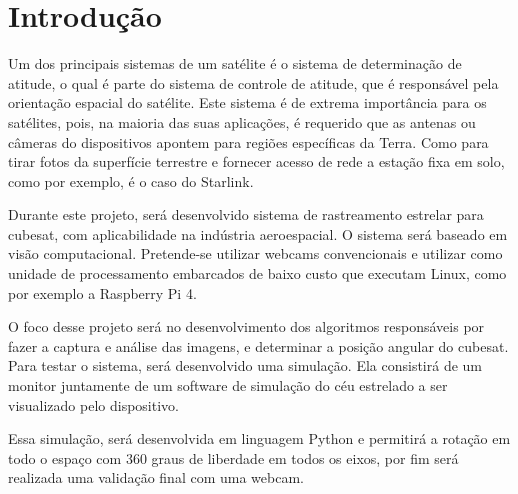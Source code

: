 \chapter{Introdução}
\label{cap:Introducao_init}


Um dos principais sistemas de um satélite é o sistema de determinação de atitude, o qual é parte do sistema de controle de atitude, que é responsável pela orientação espacial do satélite. 
Este sistema é de extrema importância para os satélites, pois, na maioria das suas aplicações, é requerido que as antenas ou câmeras do dispositivos apontem para regiões específicas da Terra. 
Como para tirar fotos da superfície terrestre e fornecer acesso de rede a estação fixa em solo, como por exemplo, é o caso do Starlink.

Durante este projeto, será desenvolvido sistema de rastreamento estrelar para cubesat, com aplicabilidade  na indústria aeroespacial. O sistema será baseado em visão computacional. Pretende-se utilizar webcams convencionais e utilizar como unidade de processamento embarcados de baixo custo que executam Linux, como por exemplo a Raspberry Pi 4.

O foco desse projeto será no desenvolvimento dos algoritmos responsáveis por fazer a captura e análise das imagens, e determinar a posição  angular do cubesat. Para testar o sistema, será desenvolvido uma simulação. Ela consistirá de um monitor juntamente de um software  de simulação do céu estrelado a ser visualizado pelo dispositivo. 

Essa simulação, será desenvolvida em linguagem Python e permitirá a rotação em todo o espaço com 360 graus de liberdade em todos os eixos, por fim será realizada uma validação final com uma webcam.
